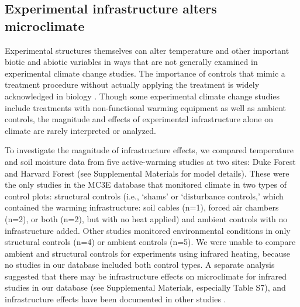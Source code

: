 \documentclass{article}
\begin{document}
\subsection* {Experimental infrastructure alters microclimate}
Experimental structures themselves can alter temperature and other important biotic and abiotic variables in ways that are not generally examined in experimental climate change studies. The importance of controls that mimic a treatment procedure without actually applying the treatment is widely acknowledged in biology \citep[e.g.,][]{dayton1971,spector2001,johnson2002,quinn2002}. Though some experimental climate change studies include treatments with non-functional warming equipment as well as ambient controls, the magnitude and effects of experimental infrastructure alone on climate are rarely interpreted or analyzed.
\par To investigate the magnitude of infrastructure effects, we compared temperature and soil moisture data from five active-warming studies at two sites: Duke Forest and Harvard Forest \citep{farnsworth1995,clark2014b, marchin2015, pelini2011}(see Supplemental Materials for model details). These were the only studies in the MC3E database that monitored climate in two types of control plots: structural controls (i.e., `shams' or `disturbance controls,' which contained the warming infrastructure: soil cables (n=1), forced air chambers (n=2), or both (n=2), but with no heat applied) and ambient controls with no infrastructure added. Other studies monitored environmental conditions in only structural controls (n=4) or ambient controls (n=5). We were unable to compare ambient and structural controls for experiments using infrared heating, because no studies in our database included both control types. A separate analysis suggested that there may be infrastructure effects on microclimate for infrared studies in our database (see Supplemental Materials, especially Table S7), and infrastructure effects have been documented in other studies \citep[e.g., shading, Table 1][]{kimball2008}. 
\end{document}
